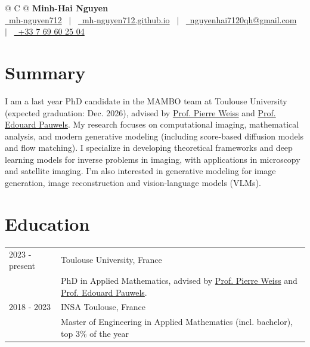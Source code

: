 \documentclass[a4paper,11pt]{article}
\begin{document}
\pagestyle{empty} 

\begin{tabularx}{\linewidth}{@{} C @{}}
 \hfill {\Huge{\textbf{Minh-Hai Nguyen}}} \\[7.5pt]
\href{https://www.linkedin.com/in/mh-nguyen712/}{\raisebox{-0.05\height}\faLinkedin\ mh-nguyen712} \ \(|\) \ 
\href{https://mh-nguyen712.github.io/}{\raisebox{-0.05\height}\faGlobe \ mh-nguyen712.github.io} \ \(|\) \ 
\href{mailto:nguyenhai7120qh@gmail.com}{\raisebox{-0.05\height}\faEnvelope \ nguyenhai7120qh@gmail.com} \ \(|\) \ 
\href{tel:+33 7 69 60 25 04}{\raisebox{-0.05\height}\faMobile \ +33 7 69 60 25 04} \\
\end{tabularx}

\vspace*{-0.3cm}
\section{Summary}
    I am a last year PhD candidate in the MAMBO team at Toulouse University (expected graduation: Dec. 2026), advised by \href{https://pierre-weiss.github.io/}{Prof. Pierre Weiss} and \href{https://edouardpauwels.fr/}{Prof. Edouard Pauwels}.
    My research focuses on computational imaging, mathematical analysis, and modern generative modeling (including score-based diffusion models and flow matching). I specialize in developing theoretical frameworks and deep learning models for inverse problems in imaging, with applications in microscopy and satellite imaging. I'm also interested in generative modeling for image generation, image reconstruction and vision-language models (VLMs). 

\section{Education}
\begin{tabularx}{\linewidth}{@{}l X@{}}	
2023 - present & Toulouse University, France \hfill \\
            & PhD in Applied Mathematics, advised by \href{https://pierre-weiss.github.io/}{Prof. Pierre Weiss} and \href{https://edouardpauwels.fr/}{Prof. Edouard Pauwels}. \\
2018 - 2023 & INSA Toulouse, France \hfill  \\
            & Master of Engineering in Applied Mathematics (incl. bachelor), top 3\% of the year \\
\end{tabularx}
\end{document}
